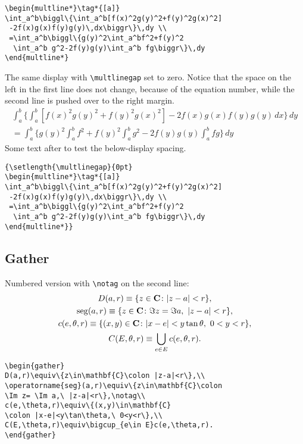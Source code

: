 \documentclass[draft]{amsart}
\theoremstyle{definition}
\theoremstyle{remark}
\begin{document}
\begin{verbatim}
\begin{multline*}\tag*{[a]}
\int_a^b\biggl\{\int_a^b[f(x)^2g(y)^2+f(y)^2g(x)^2]
 -2f(x)g(x)f(y)g(y)\,dx\biggr\}\,dy \\
 =\int_a^b\biggl\{g(y)^2\int_a^bf^2+f(y)^2
  \int_a^b g^2-2f(y)g(y)\int_a^b fg\biggr\}\,dy
\end{multline*}
\end{verbatim}

The same display with \verb=\multlinegap= set to zero.
Notice that the space on the left in
the first line does not change, because of the equation number, while
the second line is pushed over to the right margin.
{\setlength{\multlinegap}{0pt}
\begin{multline*}\tag*{[a]}
\int_a^b\biggl\{\int_a^b[f(x)^2g(y)^2+f(y)^2g(x)^2]
 -2f(x)g(x)f(y)g(y)\,dx\biggr\}\,dy \\
 =\int_a^b\biggl\{g(y)^2\int_a^bf^2+f(y)^2
  \int_a^b g^2-2f(y)g(y)\int_a^b fg\biggr\}\,dy
\end{multline*}}%
Some text after to test the below-display spacing.

\begin{verbatim}
{\setlength{\multlinegap}{0pt}
\begin{multline*}\tag*{[a]}
\int_a^b\biggl\{\int_a^b[f(x)^2g(y)^2+f(y)^2g(x)^2]
 -2f(x)g(x)f(y)g(y)\,dx\biggr\}\,dy \\
 =\int_a^b\biggl\{g(y)^2\int_a^bf^2+f(y)^2
  \int_a^b g^2-2f(y)g(y)\int_a^b fg\biggr\}\,dy
\end{multline*}}
\end{verbatim}

\subsection{Gather}
Numbered version with \verb;\notag; on the second line:
\begin{gather}
D(a,r)\equiv\{z\in\mathbf{C}\colon |z-a|<r\},\\
\operatorname{seg}(a,r)\equiv\{z\in\mathbf{C}\colon
\Im z= \Im a,\ |z-a|<r\},\notag\\
c(e,\theta,r)\equiv\{(x,y)\in\mathbf{C}
\colon |x-e|<y\tan\theta,\ 0<y<r\},\\
C(E,\theta,r)\equiv\bigcup_{e\in E}c(e,\theta,r).
\end{gather}
\begin{verbatim}
\begin{gather}
D(a,r)\equiv\{z\in\mathbf{C}\colon |z-a|<r\},\\
\operatorname{seg}(a,r)\equiv\{z\in\mathbf{C}\colon
\Im z= \Im a,\ |z-a|<r\},\notag\\
c(e,\theta,r)\equiv\{(x,y)\in\mathbf{C}
\colon |x-e|<y\tan\theta,\ 0<y<r\},\\
C(E,\theta,r)\equiv\bigcup_{e\in E}c(e,\theta,r).
\end{gather}
\end{verbatim}
\end{document}
